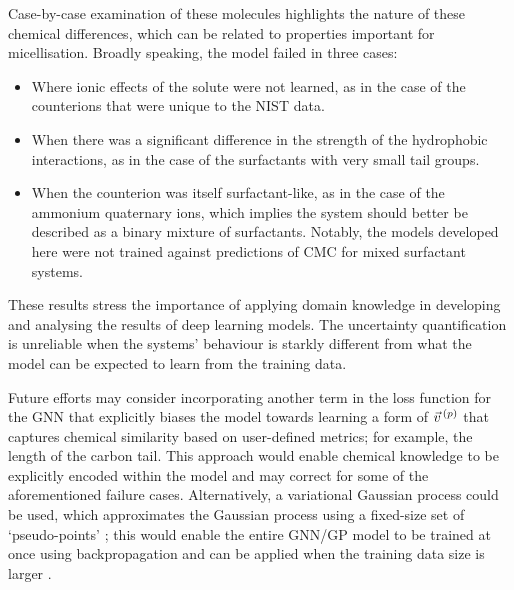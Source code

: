 Case-by-case examination of these molecules highlights the nature of these
chemical differences, which can be related to properties important for
micellisation. Broadly speaking, the model failed in three cases:
\begin{itemize}
    \item Where ionic effects of the solute were not learned, as in the case of the counterions that were unique to the NIST data.
    \item When there was a significant difference in the strength of the
          hydrophobic interactions, as in the case of the surfactants with very small
          tail groups.
    \item When the counterion was itself surfactant-like, as in the case of the
          ammonium quaternary ions, which implies the system should better be
          described as a binary mixture of surfactants. Notably, the models
          developed here were not trained against predictions of CMC for mixed
          surfactant systems.
\end{itemize}
These results stress the importance of applying domain knowledge in developing
and analysing the results of deep learning models. The uncertainty
quantification is unreliable when the systems' behaviour is starkly different
from what the model can be expected to learn from the training data.

Future efforts may consider incorporating another term in the loss function for
the GNN that explicitly biases the model towards learning a form of $\vec{v}^{\,(p)}{}$
that captures chemical similarity based on user-defined metrics; for example,
the length of the carbon tail. This approach would enable chemical knowledge to
be explicitly encoded within the model and may correct for some of the
aforementioned failure cases. Alternatively, a variational Gaussian process
could be used, which approximates the Gaussian process using a fixed-size set of
`pseudo-points' \cite{hensmanGaussianProcessesBig2013}; this would enable the
entire GNN/GP model to be trained at once using backpropagation and can be
applied when the training data size is larger
\cite{moriartyUnlockNNUncertaintyQuantification2022}.